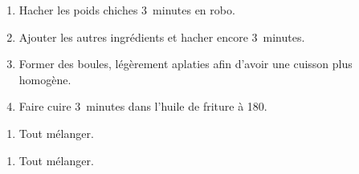 \altdish{}
\serves{}


\begin{ingredients}
\end{ingredients}

\begin{recipe}
  \begin{enumerate}

  \item Hacher les poids chiches 3~minutes en robo.

  \item Ajouter les autres ingrédients et hacher encore 3~minutes.

  \item Former des boules, légèrement aplaties afin d'avoir une cuisson plus homogène.

  \item Faire cuire 3~minutes dans l'huile de friture à 180\degreeC.

  \end{enumerate}
\end{recipe}


\begin{ingredients}
\end{ingredients}


\begin{recipe}
  \begin{enumerate}

  \item Tout mélanger.

  \end{enumerate}
\end{recipe}


\begin{ingredients}
\end{ingredients}


\begin{recipe}
  \begin{enumerate}

  \item Tout mélanger.

  \end{enumerate}
\end{recipe}


